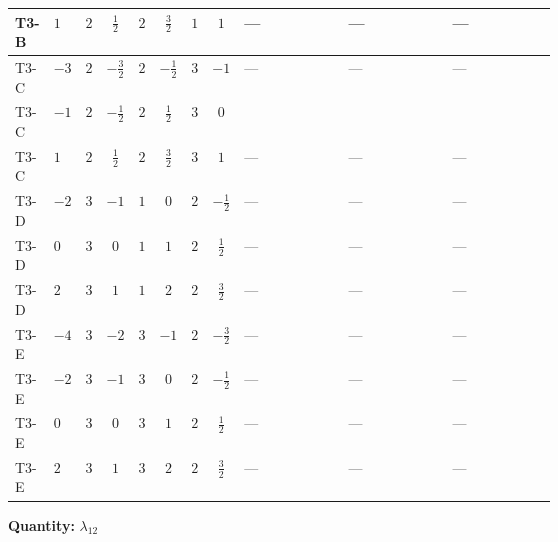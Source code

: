 \documentclass[8pt]{article}
\begin{document}
\begin{landscape}
\begin{longtable}{@{}llcccccc >{\raggedright\arraybackslash}p{0.21\linewidth} >{\raggedright\arraybackslash}p{0.21\linewidth} >{\raggedright\arraybackslash}p{0.21\linewidth}@{}}
\midrule
T3-B & $1$ & $2$ & $\frac{1}{2}$ & $2$ & $\frac{3}{2}$ & $1$ & $1$ & --- & --- & --- \\
\midrule
T3-C & $-3$ & $2$ & $-\frac{3}{2}$ & $2$ & $-\frac{1}{2}$ & $3$ & $-1$ & --- & --- & --- \\
\midrule
T3-C & $-1$ & $2$ & $-\frac{1}{2}$ & $2$ & $\frac{1}{2}$ & $3$ & $0$ & \scriptsize\adjustbox{max width=\linewidth}{$\begin{gathered} +{\lambda_{HS_1}^{(1)}} (4 {\lambda_{H H^\dagger S_1^\dagger S_2^\dagger}^{\rm Cross}}+3 {\lambda_{11}})\end{gathered}$} & \scriptsize\adjustbox{max width=\linewidth}{$\begin{gathered} +{\lambda_{HS_1}^{(A)}} \left(\frac{3 {\lambda_{H H^\dagger S_1^\dagger S_2^\dagger}^{\rm Cross}}}{2}+\frac{3 {\lambda_{11}}}{4}\right)\end{gathered}$} & \scriptsize\adjustbox{max width=\linewidth}{$\begin{gathered} +{\lambda_{HS_2}^{(1)}} (4 {\lambda_{H H^\dagger S_1^\dagger S_2^\dagger}^{\rm Cross}}+3 {\lambda_{10}})\end{gathered}$} \\
\midrule
T3-C & $1$ & $2$ & $\frac{1}{2}$ & $2$ & $\frac{3}{2}$ & $3$ & $1$ & --- & --- & --- \\
\midrule
T3-D & $-2$ & $3$ & $-1$ & $1$ & $0$ & $2$ & $-\frac{1}{2}$ & --- & --- & --- \\
\midrule
T3-D & $0$ & $3$ & $0$ & $1$ & $1$ & $2$ & $\frac{1}{2}$ & --- & --- & --- \\
\midrule
T3-D & $2$ & $3$ & $1$ & $1$ & $2$ & $2$ & $\frac{3}{2}$ & --- & --- & --- \\
\midrule
T3-E & $-4$ & $3$ & $-2$ & $3$ & $-1$ & $2$ & $-\frac{3}{2}$ & --- & --- & --- \\
\midrule
T3-E & $-2$ & $3$ & $-1$ & $3$ & $0$ & $2$ & $-\frac{1}{2}$ & --- & --- & --- \\
\midrule
T3-E & $0$ & $3$ & $0$ & $3$ & $1$ & $2$ & $\frac{1}{2}$ & --- & --- & --- \\
\midrule
T3-E & $2$ & $3$ & $1$ & $3$ & $2$ & $2$ & $\frac{3}{2}$ & --- & --- & --- \\
\midrule
\bottomrule
\end{longtable}
\clearpage
\noindent\textbf{Quantity: }$\lambda_{12}$\par\smallskip

\end{landscape}
\end{document}
